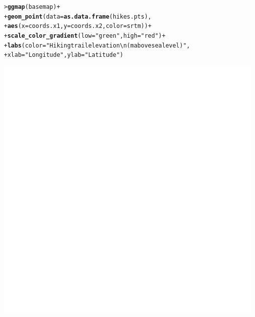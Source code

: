 \documentclass[12pt,oneside]{book}\usepackage[]{graphicx}\usepackage[]{color}
\makeatletter
\def\maxwidth{ %
  \ifdim\Gin@nat@width>\linewidth
    \linewidth
  \else
    \Gin@nat@width
  \fi
}
\newcommand{\hlstr}[1]{\textcolor[rgb]{0.192,0.494,0.8}{#1}}%
\newcommand{\hlopt}[1]{\textcolor[rgb]{0,0,0}{#1}}%
\newcommand{\hlstd}[1]{\textcolor[rgb]{0.345,0.345,0.345}{#1}}%
\newcommand{\hlkwc}[1]{\textcolor[rgb]{0.333,0.667,0.333}{#1}}%
\newcommand{\hlkwd}[1]{\textcolor[rgb]{0.737,0.353,0.396}{\textbf{#1}}}%
\newenvironment{kframe}{%
 \def\at@end@of@kframe{}%
 \ifinner\ifhmode%
  \def\at@end@of@kframe{\end{minipage}}%
  \begin{minipage}{\columnwidth}%
 \fi\fi%
 \def\FrameCommand##1{\hskip\@totalleftmargin \hskip-\fboxsep
 \colorbox{shadecolor}{##1}\hskip-\fboxsep
     \hskip-\linewidth \hskip-\@totalleftmargin \hskip\columnwidth}%
 \MakeFramed {\advance\hsize-\width
   \@totalleftmargin\z@ \linewidth\hsize
   \@setminipage}}%
 {\par\unskip\endMakeFramed%
 \at@end@of@kframe}
\newenvironment{knitrout}{}{} %
\makeatother
\begin{document}
\begin{knitrout}
\begin{kframe}
{\ttfamily\noindent\itshape\color{messagecolor}{Map from URL : http://maps.googleapis.com/maps/api/staticmap?center=44.852323,-68.625803\&zoom=14\&size=640x640\&scale=2\&maptype=terrain\&language=en-EN\&sensor=false}}\begin{alltt}
\hlstd{> }\hlkwd{ggmap}\hlstd{(basemap)} \hlopt{+}
\hlstd{+ }    \hlkwd{geom_point}\hlstd{(}\hlkwc{data}\hlstd{=}\hlkwd{as.data.frame}\hlstd{(hikes.pts),}
\hlstd{+ }               \hlkwd{aes}\hlstd{(}\hlkwc{x} \hlstd{= coords.x1,} \hlkwc{y} \hlstd{= coords.x2,} \hlkwc{color}\hlstd{=srtm))} \hlopt{+}
\hlstd{+ }    \hlkwd{scale_color_gradient}\hlstd{(}\hlkwc{low}\hlstd{=}\hlstr{"green"}\hlstd{,} \hlkwc{high}\hlstd{=}\hlstr{"red"}\hlstd{)} \hlopt{+}
\hlstd{+ }    \hlkwd{labs}\hlstd{(}\hlkwc{color} \hlstd{=} \hlstr{"Hiking trail elevation\textbackslash{}n(m above sea level)"}\hlstd{,}
\hlstd{+ }         \hlkwc{xlab}\hlstd{=}\hlstr{"Longitude"}\hlstd{,} \hlkwc{ylab}\hlstd{=}\hlstr{"Latitude"}\hlstd{)}
\end{alltt}


{\ttfamily\noindent\bfseries\color{errorcolor}{Error in FUN(X[[i]], ...): object 'srtm' not found}}\end{kframe}
\includegraphics[width=\maxwidth]{figure/unnamed-chunk-205-1} 

\end{knitrout}
\end{document}
